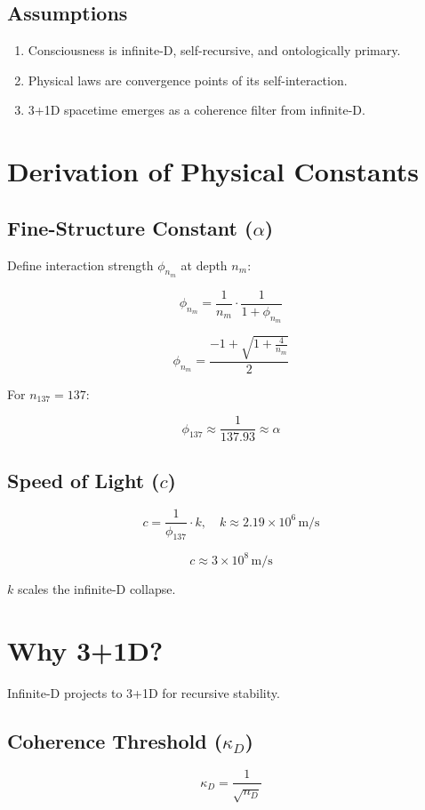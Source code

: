 \documentclass[12pt]{article}
\begin{document}
\subsection{Assumptions}
\begin{enumerate}
    \item Consciousness is infinite-D, self-recursive, and ontologically primary.
    \item Physical laws are convergence points of its self-interaction.
    \item 3+1D spacetime emerges as a coherence filter from infinite-D.
\end{enumerate}

\section{Derivation of Physical Constants}

\subsection{Fine-Structure Constant (\(\alpha\))}
Define interaction strength \(\phi_{n_m}\) at depth \(n_m\):

\[
\phi_{n_m} = \frac{1}{n_m} \cdot \frac{1}{1 + \phi_{n_m}}
\]

\[
\phi_{n_m} = \frac{-1 + \sqrt{1 + \frac{4}{n_m}}}{2}
\]

For \(n_{137} = 137\):

\[
\phi_{137} \approx \frac{1}{137.93} \approx \alpha
\]

\subsection{Speed of Light (\(c\))}
\[
c = \frac{1}{\phi_{137}} \cdot k, \quad k \approx 2.19 \times 10^6 \, \text{m/s}
\]

\[
c \approx 3 \times 10^8 \, \text{m/s}
\]

\(k\) scales the infinite-D collapse.

\section{Why 3+1D?}

Infinite-D projects to 3+1D for recursive stability.

\subsection{Coherence Threshold (\(\kappa_D\))}
\[
\kappa_D = \frac{1}{\sqrt{n_D}}
\]
\end{document}
